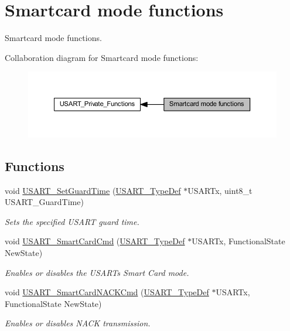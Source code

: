 \hypertarget{group___u_s_a_r_t___group6}{}\section{Smartcard mode functions}
\label{group___u_s_a_r_t___group6}


Smartcard mode functions.  


Collaboration diagram for Smartcard mode functions\+:\nopagebreak
\begin{figure}[H]
\begin{center}
\leavevmode
\includegraphics[width=350pt]{group___u_s_a_r_t___group6}
\end{center}
\end{figure}
\subsection*{Functions}
\begin{DoxyCompactItemize}
\item 
void \hyperlink{group___u_s_a_r_t___group6_gac4a35c6acd71ae7e0d67c1f03f0a8777}{U\+S\+A\+R\+T\+\_\+\+Set\+Guard\+Time} (\hyperlink{struct_u_s_a_r_t___type_def}{U\+S\+A\+R\+T\+\_\+\+Type\+Def} $\ast$U\+S\+A\+R\+Tx, uint8\+\_\+t U\+S\+A\+R\+T\+\_\+\+Guard\+Time)
\begin{DoxyCompactList}\small\item\em Sets the specified U\+S\+A\+RT guard time. \end{DoxyCompactList}\item 
void \hyperlink{group___u_s_a_r_t___group6_gabd1347e244c623447151ba3a5e986c5f}{U\+S\+A\+R\+T\+\_\+\+Smart\+Card\+Cmd} (\hyperlink{struct_u_s_a_r_t___type_def}{U\+S\+A\+R\+T\+\_\+\+Type\+Def} $\ast$U\+S\+A\+R\+Tx, Functional\+State New\+State)
\begin{DoxyCompactList}\small\item\em Enables or disables the U\+S\+A\+RT\textquotesingle{}s Smart Card mode. \end{DoxyCompactList}\item 
void \hyperlink{group___u_s_a_r_t___group6_ga62e22f47e38aa53f2edce8771f7a5dfa}{U\+S\+A\+R\+T\+\_\+\+Smart\+Card\+N\+A\+C\+K\+Cmd} (\hyperlink{struct_u_s_a_r_t___type_def}{U\+S\+A\+R\+T\+\_\+\+Type\+Def} $\ast$U\+S\+A\+R\+Tx, Functional\+State New\+State)
\begin{DoxyCompactList}\small\item\em Enables or disables N\+A\+CK transmission. \end{DoxyCompactList}\end{DoxyCompactItemize}


